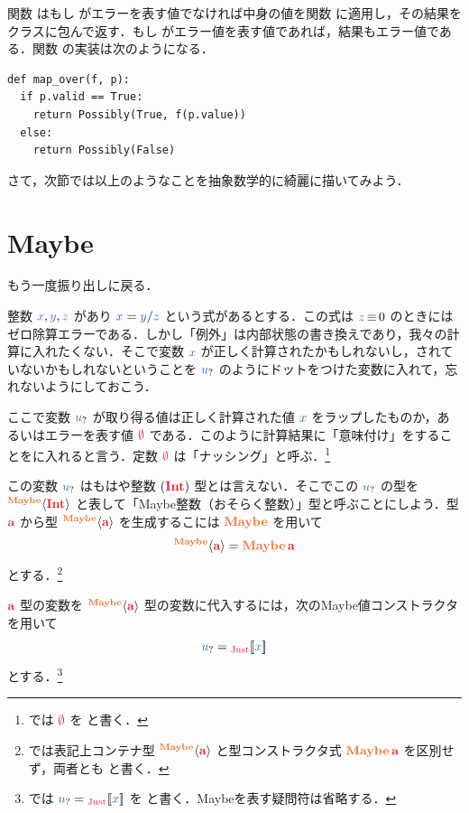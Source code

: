 \documentclass[a5paper,twoside,fleqn,draft]{jsbook}
\begin{document}
関数  はもし  がエラーを表す値でなければ中身の値を関数  に適用し，その結果を  クラスに包んで返す．もし  がエラー値を表す値であれば，結果もエラー値である．関数  の実装は次のようになる．
\begin{pythoncode}
\begin{verbatim}
def map_over(f, p):
  if p.valid == True:
    return Possibly(True, f(p.value))
  else:
    return Possibly(False)
\end{verbatim}
\end{pythoncode}

さて，次節では以上のようなことを抽象数学的に綺麗に描いてみよう．

\section{Maybe}

もう一度振り出しに戻る．

整数 $\hVar{x},\hVar{y},\hVar{z}$ があり $\hVar{x}=\hVar{y}/\hVar{z}$ という式があるとする．この式は $\hVar{z}\hIfEq0$ のときにはゼロ除算エラーである．しかし「例外」は内部状態の書き換えであり，我々の計算に入れたくない．そこで変数 $\hVar{x}$ が正しく計算されたかもしれないし，されていないかもしれないということを $\hMaybeVar{u}$ のようにドットをつけた変数に入れて，忘れないようにしておこう．

ここで変数 $\hMaybeVar{u}$ が取り得る値は正しく計算された値 $\hVar{x}$ をラップしたものか，あるいはエラーを表す値 $\hNothing$ である．このように計算結果に「意味付け」をすることをに入れると言う．定数 $\hNothing$ は「ナッシング」と呼ぶ．\footnote{\haskell では $\hNothing$ を  と書く．}

この変数 $\hMaybeVar{u}$ はもはや整数 $(\hInt)$ 型とは言えない．そこでこの $\hMaybeVar{u}$ の型を $\hMaybeConstruct{\hInt}$ と表して「Maybe整数（おそらく整数）」型と呼ぶことにしよう．型 $\hTypeName{a}$ から型 $\hMaybeConstruct{\hTypeName{a}}$ を生成するこには $\hMaybe$ を用いて
\begin{equation}
  \hMaybeConstruct{\hTypeName{a}}
  =\hMaybe\,\hTypeName{a}
\end{equation}
とする．\footnote{\haskell では表記上コンテナ型 $\hMaybeConstruct{\hTypeName{a}}$ と型コンストラクタ式 $\hMaybe\,\hTypeName{a}$ を区別せず，両者とも  と書く．}

$\hTypeName{a}$ 型の変数を $\hMaybeConstruct{\hTypeName{a}}$ 型の変数に代入するには，次のMaybe値コンストラクタを用いて
\begin{equation}
  \hMaybeVar{u}
  =\hJustWith{\hVar{x}}
\end{equation}
とする．\footnote{\haskell では $\hMaybeVar{u}=\hJustWith{\hVar{x}}$ を  と書く．Maybeを表す疑問符は省略する．}
\end{document}
